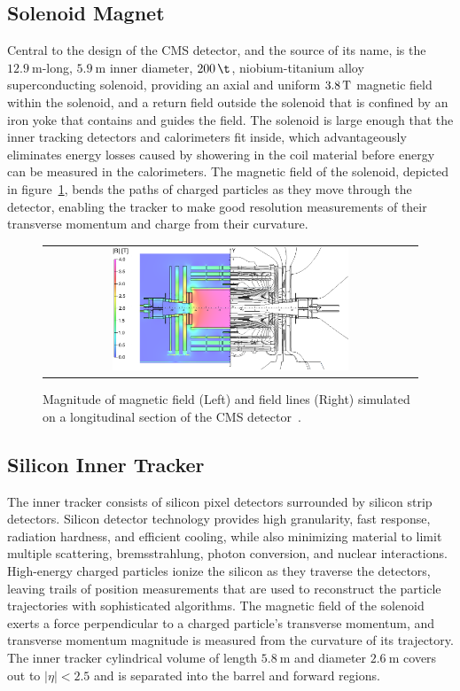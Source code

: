 \subsection{Solenoid Magnet}
Central to the design of the CMS detector, and the source of its name, is the $\SI{12.9}{\m}$-long, $\SI{5.9}{\m}$ inner diameter, $\SI{200}{\t}$, niobium-titanium alloy superconducting solenoid, providing an axial and uniform $\SI{3.8}{\T}$ magnetic field within the solenoid, and a return field outside the solenoid that is confined by an iron yoke that contains and guides the field.
The solenoid is large enough that the inner tracking detectors and calorimeters fit inside, which advantageously eliminates energy losses caused by showering in the coil material before energy can be measured in the calorimeters.
The magnetic field of the solenoid, depicted in figure~\ref{Solenoid}, bends the paths of charged particles as they move through the detector, enabling the tracker to make good resolution measurements of their transverse momentum and charge from their curvature.
\begin{figure}[htb]
  \begin{center}
    \begin{tabular}{c}
        \includegraphics[width=0.65\textwidth]{fig_LHC_CMS/Solenoid.png}
    \end{tabular}
    \caption{Magnitude of magnetic field (Left) and field lines (Right) simulated on a longitudinal section of the CMS detector~\cite{Chatrchyan:1215500}.
            }
    \label{Solenoid}
  \end{center}
\end{figure}


\subsection{Silicon Inner Tracker}
The inner tracker consists of silicon pixel detectors surrounded by silicon strip detectors.
Silicon detector technology provides high granularity, fast response, radiation hardness, and efficient cooling, while also minimizing material to limit multiple scattering, bremsstrahlung, photon conversion, and nuclear interactions.
High-energy charged particles ionize the silicon as they traverse the detectors, leaving trails of position measurements that are used to reconstruct the particle trajectories with sophisticated algorithms.
The magnetic field of the solenoid exerts a force perpendicular to a charged particle's transverse momentum, and transverse momentum magnitude is measured from the curvature of its trajectory.
The inner tracker cylindrical volume of length $\SI{5.8}{\m}$ and diameter $\SI{2.6}{\m}$ covers out to $\vert \eta \vert < 2.5$ and is separated into the barrel and forward regions.


